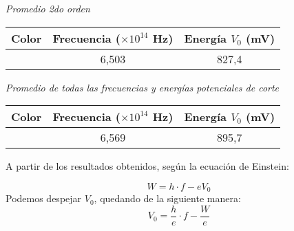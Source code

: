 \documentclass[a4paper]{article}
\begin{document}
      \newpage
      \noindent
      \thispagestyle{fancy}

      \begin{minipage}[c]{7.5cm}
        \vspace{5mm}
        \centering
        \textit{Promedio 2do orden} 
        \vspace{2mm}
      \end{minipage}

      \begin{tabular}{ c c c }
        \toprule
        Color & Frecuencia ($\times 10^{14}$ Hz) & Energía $V_{0}$ (mV) \\
          \midrule
          & 6,503 & 827,4 \\
        \bottomrule
      \end{tabular}
      \vspace{5mm}
      
      \begin{minipage}[c]{7.5cm}
        \vspace{5mm}
        \centering
        \textit{Promedio de todas las frecuencias y energías potenciales de corte} 
        \vspace{2mm}
      \end{minipage}
      
      \begin{tabular}{ c c c }
        \toprule
        Color & Frecuencia ($\times 10^{14}$ Hz) & Energía $V_{0}$ (mV) \\
          \midrule
          & 6,569 & 895,7 \\
        \bottomrule
      \end{tabular}
      \vspace{5mm}

      \indent A partir de los resultados obtenidos, según la ecuación de Einstein:
      
      \begin{equation}
        W = h \cdot f - eV_{0}
      \end{equation}
      \indent Podemos despejar $V_{0}$, quedando de la siguiente manera:
      \begin{equation}
        V_{0} = \frac{h}{e} \cdot f - \frac{W}{e}
      \end{equation}

      \vspace{5mm}
\end{document}
